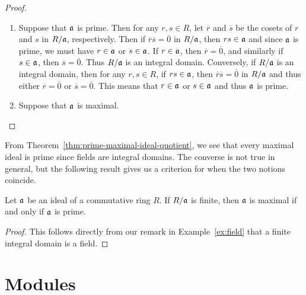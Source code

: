 \begin{proof}\(\)

    \begin{enumerate}[wide, label=(\alph*), nosep]
        \item Suppose that \(\mathfrak{a}\) is prime. Then for any \(r, s \in R\),
        let \(\overline{r}\) and \(\overline{s}\) be the cosets of \(r\) and
        \(s\) in \(R/\mathfrak{a}\), respectively. Then if \(\overline{r}\overline{s}
        = \overline{0}\) in \(R/\mathfrak{a}\), then \(rs \in \mathfrak{a}\) and since
        \(\mathfrak{a}\) is prime, we must have \(r \in \mathfrak{a}\) or \(s \in
        \mathfrak{a}\). If \(r \in \mathfrak{a}\), then \(\overline{r} = \overline{0}\),
        and similarly if \(s \in \mathfrak{a}\), then \(\overline{s} =
        \overline{0}\). Thus \(R/\mathfrak{a}\) is an integral domain. Conversely, if
        \(R/\mathfrak{a}\) is an integral domain, then for any \(r, s \in R\), if
        \(rs \in \mathfrak{a}\), then \(\overline{r}\overline{s} = \overline{0}\) in
        \(R/\mathfrak{a}\) and thus either \(\overline{r} = \overline{0}\) or
        \(\overline{s} = \overline{0}\). This means that \(r \in \mathfrak{a}\) or
        \(s \in \mathfrak{a}\) and thus \(\mathfrak{a}\) is prime.

        \item Suppose that \(\mathfrak{a}\) is maximal. 
    \end{enumerate}
    
\end{proof}

From Theorem~\ref{thm:prime-maximal-ideal-quotient}, we see that every maximal
ideal is prime since fields are integral domains. The converse is not true in
general, but the following result gives us a criterion for when the two notions
coincide.

\begin{theorem}
    \label{thm:prime-maximal-ideal-criterion}
    Let \(\mathfrak{a}\) be an ideal of a commutative ring \(R\). If \(R/\mathfrak{a}\) is
    finite, then \(\mathfrak{a}\) is maximal if and only if \(\mathfrak{a}\) is prime.
\end{theorem}

\begin{proof}
    This follows directly from our remark in Example~\ref{ex:field} that a
    finite integral domain is a field.
\end{proof}

\section{Modules}
\label{sec:modules}

